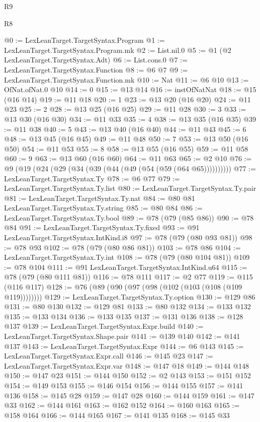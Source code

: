 \begin{lexlean}{R9}
\begin{lexlean}{R8}
\begin{coremodule}
{{{{{{{{{{{{{{{{{{{{{{{{{{{{{{{{{{{{{{{{@0 := LexLeanTarget.TargetSyntax.Program
@1 := LexLeanTarget.TargetSyntax.Program.mk
@2 := List.nil.{0}
@5 := @1 (@2 LexLeanTarget.TargetSyntax.Adt)
@6 := List.cons.{0}
@7 := LexLeanTarget.TargetSyntax.Function
@8 := @6 @7
@9 := LexLeanTarget.TargetSyntax.Function.mk
@10 := Nat
@11 := @6 @10
@13 := OfNat.ofNat.{0} @10
@14 := 0
@15 := @13 @14
@16 := instOfNatNat
@18 := @15 (@16 @14)
@19 := @11 @18
@20 := 1
@23 := @13 @20 (@16 @20)
@24 := @11 @23
@25 := 2
@28 := @13 @25 (@16 @25)
@29 := @11 @28
@30 := 3
@33 := @13 @30 (@16 @30)
@34 := @11 @33
@35 := 4
@38 := @13 @35 (@16 @35)
@39 := @11 @38
@40 := 5
@43 := @13 @40 (@16 @40)
@44 := @11 @43
@45 := 6
@48 := @13 @45 (@16 @45)
@49 := @11 @48
@50 := 7
@53 := @13 @50 (@16 @50)
@54 := @11 @53
@55 := 8
@58 := @13 @55 (@16 @55)
@59 := @11 @58
@60 := 9
@63 := @13 @60 (@16 @60)
@64 := @11 @63
@65 := @2 @10
@76 := @9 (@19 (@24 (@29 (@34 (@39 (@44 (@49 (@54 (@59 (@64 @65))))))))))
@77 := LexLeanTarget.TargetSyntax.Ty
@78 := @6 @77
@79 := LexLeanTarget.TargetSyntax.Ty.list
@80 := LexLeanTarget.TargetSyntax.Ty.pair
@81 := LexLeanTarget.TargetSyntax.Ty.nat
@84 := @80 @81 LexLeanTarget.TargetSyntax.Ty.string
@85 := @80 @84
@86 := LexLeanTarget.TargetSyntax.Ty.bool
@89 := @78 (@79 (@85 @86))
@90 := @78 @84
@91 := LexLeanTarget.TargetSyntax.Ty.fixed
@93 := @91 LexLeanTarget.TargetSyntax.IntKind.i8
@97 := @78 (@79 (@80 @93 @81))
@98 := @78 @93
@102 := @78 (@79 (@80 @86 @81))
@103 := @78 @86
@104 := LexLeanTarget.TargetSyntax.Ty.int
@108 := @78 (@79 (@80 @104 @81))
@109 := @78 @104
@111 := @91 LexLeanTarget.TargetSyntax.IntKind.u64
@115 := @78 (@79 (@80 @111 @81))
@116 := @78 @111
@117 := @2 @77
@119 := @115 (@116 @117)
@128 := @76 (@89 (@90 (@97 (@98 (@102 (@103 (@108 (@109 @119))))))))
@129 := LexLeanTarget.TargetSyntax.Ty.option
@130 := @129 @86
@131 := @80 @130
@132 := @129 @81
@133 := @80 @132
@134 := @133 @132
@135 := @133 @134
@136 := @133 @135
@137 := @131 @136
@138 := @128 @137
@139 := LexLeanTarget.TargetSyntax.Expr.build
@140 := LexLeanTarget.TargetSyntax.Shape.pair
@141 := @139 @140
@142 := @141 @137
@143 := LexLeanTarget.TargetSyntax.Expr
@144 := @6 @143
@145 := LexLeanTarget.TargetSyntax.Expr.call
@146 := @145 @23
@147 := LexLeanTarget.TargetSyntax.Expr.var
@148 := @147 @18
@149 := @144 @148
@150 := @147 @23
@151 := @144 @150
@152 := @2 @143
@153 := @151 @152
@154 := @149 @153
@155 := @146 @154
@156 := @144 @155
@157 := @141 @136
@158 := @145 @28
@159 := @147 @28
@160 := @144 @159
@161 := @147 @33
@162 := @144 @161
@163 := @162 @152
@164 := @160 @163
@165 := @158 @164
@166 := @144 @165
@167 := @141 @135
@168 := @145 @33
}}}}}}}}}}}}}}}}}}}}}}}}}}}}}}}}}}}}}}}}
\end{coremodule}
\end{lexlean}
\end{lexlean}
